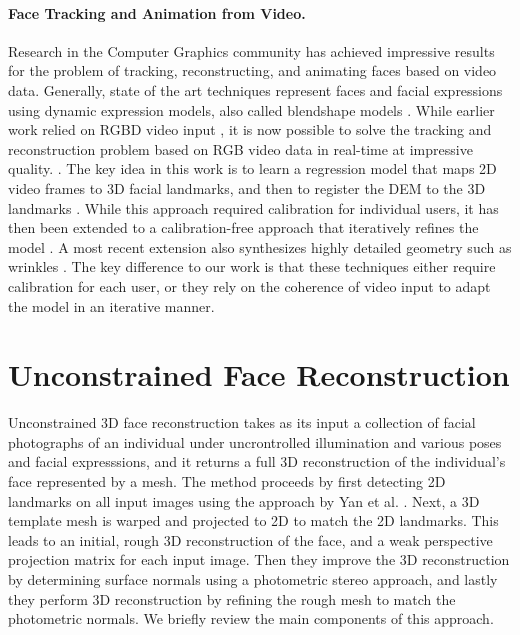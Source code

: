 \paragraph*{Face Tracking and Animation from Video.} Research in the Computer Graphics community has achieved impressive results for the problem of tracking, reconstructing, and animating faces based on video data. Generally, state of the art techniques represent faces and facial expressions using dynamic expression models, also called blendshape models \cite{Cao:2014:FWA}. While earlier work relied on RGBD video input \cite{Weise:2011:RPF,Li:2013:RFA,Bouaziz:2013:OMR}, it is now possible to solve the tracking and reconstruction problem based on RGB video data in real-time at impressive quality. \cite{Cao:2014:DDE,Cao:2015:RHF,GZCVVPT16,thies2016face}. The key idea in this work is to learn a regression model that maps 2D video frames to 3D facial landmarks, and then to register the DEM to the 3D landmarks \cite{Cao:2013:SRR}. While this approach required calibration for individual users, it has then been extended to a calibration-free approach that iteratively refines the model \cite{Cao:2014:DDE}. A most recent extension also synthesizes highly detailed geometry such as wrinkles \cite{Cao:2015:RHF}. The key difference to our work is that these techniques either require calibration for each user, or they rely on the coherence of video input to adapt the model in an iterative manner.


\section{Unconstrained Face Reconstruction}
\label{sec:unconstrainedfacereconstruction}

Unconstrained 3D face reconstruction \cite{Roth:2015:UFR} takes as its input  a collection of facial photographs of an individual under uncrontrolled illumination and various poses and facial expresssions, and it returns a full 3D reconstruction of the individual's face represented by a mesh. The method proceeds by first detecting 2D landmarks on all input images using the approach by Yan et al. \cite{Yan:2013:LCM}. Next, a 3D template mesh is warped and projected to 2D to match the 2D landmarks. This leads to an initial, rough 3D reconstruction of the face, and a weak perspective projection matrix for each input image. Then they improve the 3D reconstruction by determining surface normals using a photometric stereo approach, and lastly they perform 3D reconstruction by refining the rough mesh to match the photometric normals. We briefly review the main components of this approach.

